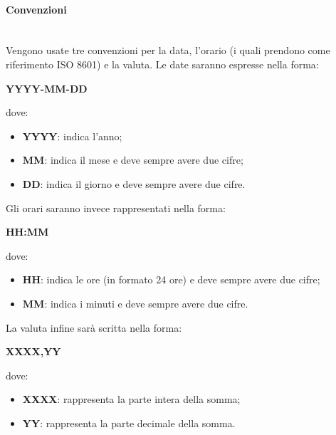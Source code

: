                 \paragraph{Convenzioni}\mbox{}\\ [1mm]
                    Vengono usate tre convenzioni per la data, l'orario (i quali prendono come riferimento ISO 8601) e la valuta. Le date saranno espresse nella forma: \newline \newline
                    \centerline{\textbf{YYYY-MM-DD}} \newline \newline
                    dove:
                    \begin{itemize}
                        \item \textbf{YYYY}: indica l'anno;
                        \item \textbf{MM}: indica il mese e deve sempre avere due cifre;
                        \item \textbf{DD}: indica il giorno e deve sempre avere due cifre.
                    \end{itemize}
                    Gli orari saranno invece rappresentati nella forma: \newline \newline
                    \centerline{\textbf{HH:MM}} \newline \newline
                    dove:
                    \begin{itemize}
                        \item \textbf{HH}: indica le ore (in formato 24 ore) e deve sempre avere due cifre;
                        \item \textbf{MM}: indica i minuti e deve sempre avere due cifre.
                    \end{itemize}
                    La valuta infine sarà scritta nella forma: \newline \newline
                    \centerline{\textbf{XXXX,YY}} \newline \newline
                    dove:
                    \begin{itemize}
                        \item \textbf{XXXX}: rappresenta la parte intera della somma;
                        \item \textbf{YY}: rappresenta la parte decimale della somma.
                    \end{itemize}
